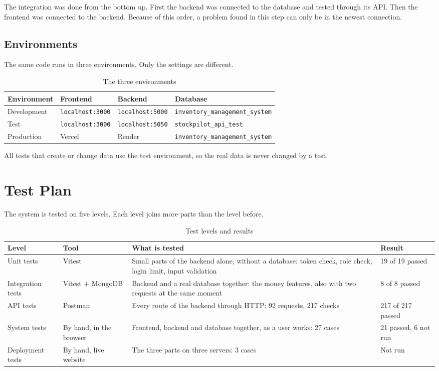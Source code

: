 \documentclass[11pt,a4paper]{article}
\newcommand{\code}[1]{\texttt{#1}}
\begin{document}
The integration was done from the bottom up. First the backend was connected to the database and tested through its API. Then the frontend was connected to the backend. Because of this order, a problem found in this step can only be in the newest connection.

\subsection{Environments}
The same code runs in three environments. Only the settings are different.
\begin{table}[h]
\centering
\begin{tabularx}{\textwidth}{@{}P{2.3cm}P{2.9cm}P{2.9cm}Y@{}}
\toprule
\textbf{Environment} & \textbf{Frontend} & \textbf{Backend} & \textbf{Database} \\
\midrule
Development & \code{localhost:3000} & \code{localhost:5000} & \code{inventory\_management\_system} \\
Test & \code{localhost:3000} & \code{localhost:5050} & \code{stockpilot\_api\_test} \\
Production & Vercel & Render & \code{inventory\_management\_system} \\
\bottomrule
\end{tabularx}
\caption{The three environments}
\end{table}
All tests that create or change data use the test environment, so the real data is never changed by a test.

\section{Test Plan}
The system is tested on five levels. Each level joins more parts than the level before.
\begin{table}[h]
\centering
\begin{tabularx}{\textwidth}{@{}P{2.4cm}P{2.6cm}YP{2.6cm}@{}}
\toprule
\textbf{Level} & \textbf{Tool} & \textbf{What is tested} & \textbf{Result} \\
\midrule
Unit tests & Vitest & Small parts of the backend alone, without a database: token check, role check, login limit, input validation & 19 of 19 passed \\
Integration tests & Vitest + MongoDB & Backend and a real database together: the money features, also with two requests at the same moment & 8 of 8 passed \\
API tests & Postman & Every route of the backend through HTTP: 92 requests, 217 checks & 217 of 217 passed \\
System tests & By hand, in the browser & Frontend, backend and database together, as a user works: 27 cases & 21 passed, 6 not run \\
Deployment tests & By hand, live website & The three parts on three servers: 3 cases & Not run \\
\bottomrule
\end{tabularx}
\caption{Test levels and results}
\end{table}
\end{document}
